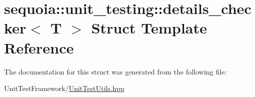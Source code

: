 \hypertarget{structsequoia_1_1unit__testing_1_1details__checker}{}\section{sequoia\+::unit\+\_\+testing\+::details\+\_\+checker$<$ T $>$ Struct Template Reference}
\label{structsequoia_1_1unit__testing_1_1details__checker}


The documentation for this struct was generated from the following file\+:\begin{DoxyCompactItemize}
\item 
Unit\+Test\+Framework/\mbox{\hyperlink{_unit_test_utils_8hpp}{Unit\+Test\+Utils.\+hpp}}\end{DoxyCompactItemize}
